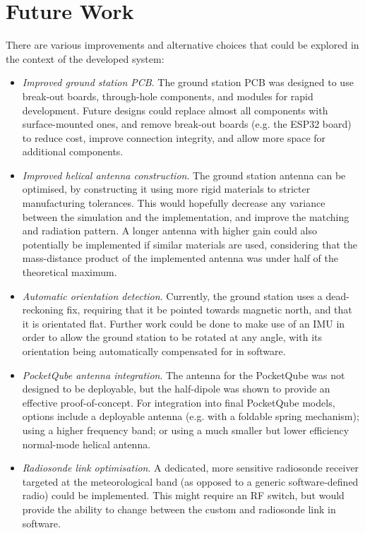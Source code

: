 \section{Future Work}\label{sec:future_work}

There are various improvements and alternative choices that could be explored in the context of the developed system:
\begin{itemize}
    \item \textit{Improved ground station PCB}. The ground station PCB was designed to use break-out boards, through-hole components, and modules for rapid development. Future designs could replace almost all components with surface-mounted ones, and remove break-out boards (e.g. the ESP32 board) to reduce cost, improve connection integrity, and allow more space for additional components.
    \item \textit{Improved helical antenna construction}. The ground station antenna can be optimised, by constructing it using more rigid materials to stricter manufacturing tolerances. This would hopefully decrease any variance between the simulation and the implementation, and improve the matching and radiation pattern. A longer antenna with higher gain could also potentially be implemented if similar materials are used, considering that the mass-distance product of the implemented antenna was under half of the theoretical maximum.
    \item \textit{Automatic orientation detection}. Currently, the ground station uses a dead-reckoning fix, requiring that it be pointed towards magnetic north, and that it is orientated flat. Further work could be done to make use of an IMU in order to allow the ground station to be rotated at any angle, with its orientation being automatically compensated for in software.
    \item \textit{PocketQube antenna integration}. The antenna for the PocketQube was not designed to be deployable, but the half-dipole was shown to provide an effective proof-of-concept. For integration into final PocketQube models, options include a deployable antenna (e.g. with a foldable spring mechanism); using a higher frequency band; or using a much smaller but lower efficiency normal-mode helical antenna.
    \item \textit{Radiosonde link optimisation}. A dedicated, more sensitive radiosonde receiver targeted at the meteorological band (as opposed to a generic software-defined radio) could be implemented. This might require an RF switch, but would provide the ability to change between the custom and radiosonde link in software.

\end{itemize}
